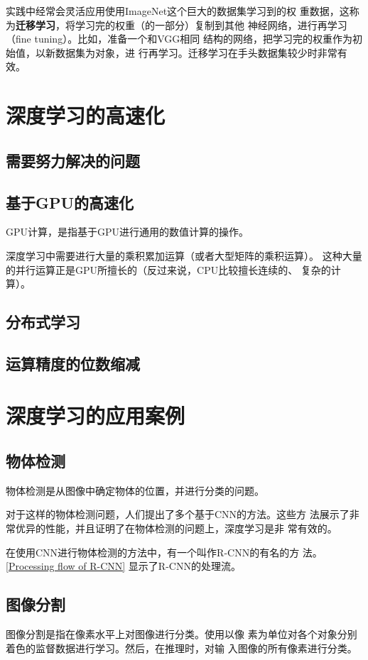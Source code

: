 \begin{tcolorbox}
    实践中经常会灵活应用使用ImageNet这个巨大的数据集学习到的权
    重数据，这称为\textbf{迁移学习}，将学习完的权重（的一部分）复制到其他
    神经网络，进行再学习（fine tuning）。比如，准备一个和VGG相同
    结构的网络，把学习完的权重作为初始值，以新数据集为对象，进
    行再学习。迁移学习在手头数据集较少时非常有效。
\end{tcolorbox}

\section{深度学习的高速化}
\subsection{需要努力解决的问题}
\subsection{基于GPU的高速化}
GPU计算，是指基于GPU进行通用的数值计算的操作。

深度学习中需要进行大量的乘积累加运算（或者大型矩阵的乘积运算）。
这种大量的并行运算正是GPU所擅长的（反过来说，CPU比较擅长连续的、
复杂的计算）。
\subsection{分布式学习}
\subsection{运算精度的位数缩减}
\section{深度学习的应用案例}
\subsection{物体检测}
物体检测是从图像中确定物体的位置，并进行分类的问题。

对于这样的物体检测问题，人们提出了多个基于CNN的方法。这些方
法展示了非常优异的性能，并且证明了在物体检测的问题上，深度学习是非
常有效的。

在使用CNN进行物体检测的方法中，有一个叫作R-CNN的有名的方
法。\autoref{Processing flow of R-CNN} 显示了R-CNN的处理流。
\subsection{图像分割}
图像分割是指在像素水平上对图像进行分类。使用以像
素为单位对各个对象分别着色的监督数据进行学习。然后，在推理时，对输
入图像的所有像素进行分类。

